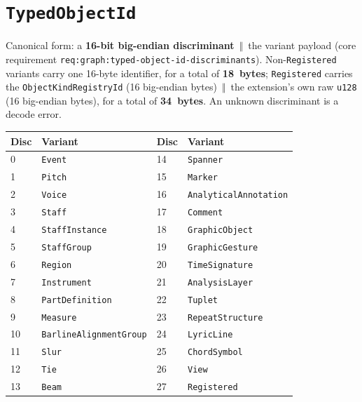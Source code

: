 \documentclass[11pt,letterpaper]{report}
\newcommand{\tablenums}[1]{{\addfontfeatures{Numbers={Lining,Tabular}}#1}}
\newcounter{requirement}[chapter]
\newcommand{\cat}{\ensuremath{\,\Vert\,}}
\begin{document}
\section{\texttt{TypedObjectId}}
\label{sec:ids:typed-object-id}

Canonical form: a \textbf{16-bit big-endian discriminant} \cat{} the variant
payload (core requirement \texttt{req:graph:typed-object-id-discriminants}).
Non-\texttt{Registered} variants carry one 16-byte identifier, for a total of
\textbf{18~bytes}; \texttt{Registered} carries the
\texttt{ObjectKindRegistryId} (16 big-endian bytes) \cat{} the extension's
own raw \texttt{u128} (16 big-endian bytes), for a total of \textbf{34~bytes}.
An unknown discriminant is a decode error.

\begingroup\small
\begin{longtable}{p{0.5in} p{1.6in} p{0.5in} p{1.6in}}
  \toprule
  \textbf{Disc} & \textbf{Variant} & \textbf{Disc} & \textbf{Variant} \\
  \midrule
  \endhead
  \tablenums{0} & \texttt{Event} & \tablenums{14} & \texttt{Spanner} \\
  \tablenums{1} & \texttt{Pitch} & \tablenums{15} & \texttt{Marker} \\
  \tablenums{2} & \texttt{Voice} & \tablenums{16} & \texttt{AnalyticalAnnotation} \\
  \tablenums{3} & \texttt{Staff} & \tablenums{17} & \texttt{Comment} \\
  \tablenums{4} & \texttt{StaffInstance} & \tablenums{18} & \texttt{GraphicObject} \\
  \tablenums{5} & \texttt{StaffGroup} & \tablenums{19} & \texttt{GraphicGesture} \\
  \tablenums{6} & \texttt{Region} & \tablenums{20} & \texttt{TimeSignature} \\
  \tablenums{7} & \texttt{Instrument} & \tablenums{21} & \texttt{AnalysisLayer} \\
  \tablenums{8} & \texttt{PartDefinition} & \tablenums{22} & \texttt{Tuplet} \\
  \tablenums{9} & \texttt{Measure} & \tablenums{23} & \texttt{RepeatStructure} \\
  \tablenums{10} & \texttt{BarlineAlignmentGroup} & \tablenums{24} & \texttt{LyricLine} \\
  \tablenums{11} & \texttt{Slur} & \tablenums{25} & \texttt{ChordSymbol} \\
  \tablenums{12} & \texttt{Tie} & \tablenums{26} & \texttt{View} \\
  \tablenums{13} & \texttt{Beam} & \tablenums{27} & \texttt{Registered} \\
  \bottomrule
\end{longtable}
\endgroup
\end{document}
